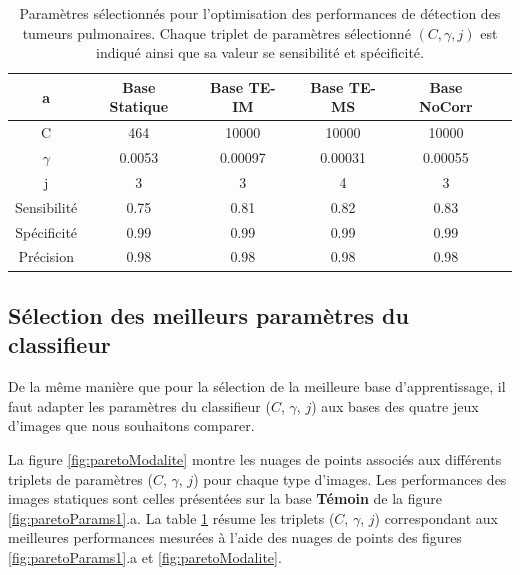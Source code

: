 \begin{table}[h!]
	\begin{center}
		\begin{tabular}{c| c c c c c}
  \hline
  a	& Base Statique	& Base TE-IM	& Base TE-MS	& Base NoCorr	\\
  \hline
 C 	& 464		& 10000		& 10000		& 10000		\\
\hline
$\gamma$& 0.0053	& 0.00097	& 0.00031	& 0.00055	\\
\hline
j	& 3		& 3		& 4		& 3		\\
\hline
\hline
Sensibilité& 0.75	& 0.81		& 0.82		& 0.83	\\
\hline
Spécificité& 0.99	& 0.99		& 0.99		& 0.99		\\
\hline
Précision& 0.98		& 0.98		& 0.98		& 0.98		\\
\hline
 		\end{tabular}

	\end{center}
\caption[Paramètres sélectionnés pour l'optimisation des performances de détection des tumeurs pulmonaires]{Paramètres sélectionnés pour l'optimisation des performances de détection des tumeurs pulmonaires. Chaque triplet de paramètres sélectionné $(C,\gamma,j)$ est indiqué ainsi que sa valeur se sensibilité et spécificité.}
\label{tab:paramsModPoumon}
\end{table}

\subsection{Sélection des meilleurs paramètres du classifieur}

De la même manière que pour la sélection de la meilleure base d'apprentissage, il faut adapter les paramètres du classifieur ($C$, $\gamma$, $j$) aux bases des quatre jeux d'images que nous souhaitons comparer.

La figure \ref{fig:paretoModalite} montre les nuages de points associés aux différents triplets de paramètres ($C$, $\gamma$, $j$) pour chaque type d'images. Les performances des images statiques sont celles présentées sur la base \textbf{Témoin} de la figure \ref{fig:paretoParams1}.a. La table \ref{tab:paramsModPoumon} résume les triplets ($C$, $\gamma$, $j$) correspondant aux meilleures performances mesurées à l'aide des nuages de points des figures \ref{fig:paretoParams1}.a et \ref{fig:paretoModalite}.

